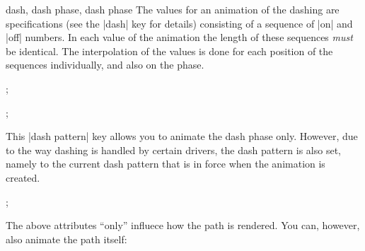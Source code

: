 \begin{tikzanimateattribute}{dash, dash phase, dash phase}
  The values for an animation of the dashing are specifications (see
  the |dash| key for details) consisting of a sequence of |on| and
  |off| numbers. In each value of the animation the length of these
  sequences \emph{must} be identical. The interpolation of the values
  is done for each position of the sequences individually, and also on
  the phase.
\begin{codeexample}[animation list={0.5,1,1.5,2}]
\tikz {}; 
\end{codeexample}
\begin{codeexample}[animation list={0.5,1,1.5,2}]
\tikz {}; 
\end{codeexample}

  This |dash pattern| key allows you to animate the dash phase
  only. However, due to the way dashing is handled by certain drivers,
  the dash pattern is also set, namely to the current dash pattern
  that is in force when the animation is created.
\begin{codeexample}[animation list={0.5,1,1.5,2}]
\tikz {}; 
\end{codeexample}
\end{tikzanimateattribute}

The above attributes ``only'' influece how the path is rendered. You
can, however, also animate the path itself:

